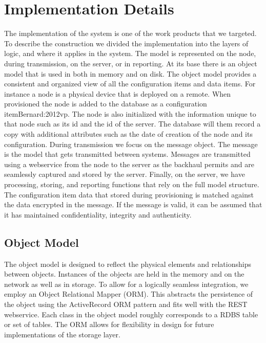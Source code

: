 \chapter{Implementation Details} The implementation of the system is one of the work products that we targeted. To describe the construction we divided the implementation into the layers of logic, and where it applies in the system.  The model is represented on the node, during transmission, on the server, or in reporting.  
At its base there is an object model that is used in both in memory and on disk.  The object model provides a consistent and organized view of all the configuration items and data items. For instance a node is a physical device that is deployed on a remote. When provisioned the node is added to the database as a configuration item{Bernard:2012vp}. The node is also initialized with the information unique to that node such as its id and the id of the server.  The database will them record a copy with additional attributes such as the date of creation of the node and its configuration.
During transmission we focus on the message object. The message is the model that gets transmitted between systems.  Messages are transmitted using a webservice from the node to the server as the backhaul permits and are seamlessly captured and stored by the server. 
Finally, on the server, we have processing, storing, and reporting functions that rely on the full model structure.  The configuration item data that stored during provisioning is matched against the data encrypted in the message. If the message is valid, it can be assumed that it has maintained confidentiality, integrity and authenticity. 

\section{Object Model}
The object model is designed to reflect the physical elements and relationships between objects. Instances of the objects are held in the memory and on the network as well as in storage. To allow for a logically seamless integration, we employ an Object Relational Mapper (ORM).
This abstracts the persistence of the object using the ActiveRecord ORM pattern \cite{Fowler:2012wd} and fits well with the REST webservice.  Each class in the object model roughly corresponds to a RDBS table or set of tables. The ORM allows for flexibility in design for future implementations of the storage layer.

